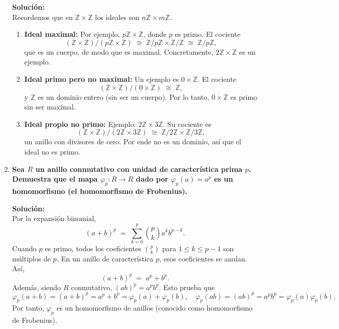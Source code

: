 \documentclass[12pt]{article}
\theoremstyle{definition}
\theoremstyle{remark}
\begin{document}
\begin{enumerate}[label=\textbf{\arabic*.}]
\textbf{Solución:}\\
Recordemos que en $\mathbb{Z} \times \mathbb{Z}$ los ideales son $n\mathbb{Z}\times m\mathbb{Z}$. 

\begin{enumerate}[label=(\alph*)]
\item \textbf{Ideal maximal:}  
   Por ejemplo, $p\mathbb{Z}\times \mathbb{Z}$, donde $p$ es primo. El cociente
   \[
   (\mathbb{Z}\times\mathbb{Z})/(p\mathbb{Z}\times \mathbb{Z})
   \;\cong\;
   \mathbb{Z}/p\mathbb{Z}
   \times
   \mathbb{Z}/\mathbb{Z}
   \;\cong\; \mathbb{Z}/p\mathbb{Z},
   \]
   que es un cuerpo, de modo que es maximal. Concretamente, $2\mathbb{Z}\times \mathbb{Z}$ es un ejemplo.

\item \textbf{Ideal primo pero no maximal:}  
   Un ejemplo es $0\times \mathbb{Z}$. El cociente
   \[
   (\mathbb{Z}\times \mathbb{Z})/(0\times \mathbb{Z})
   \;\cong\;
   \mathbb{Z},
   \]
   y $\mathbb{Z}$ es un dominio entero (sin ser un cuerpo). Por lo tanto, $0\times \mathbb{Z}$ es primo sin ser maximal.

\item \textbf{Ideal propio no primo:}  
   Ejemplo: $2\mathbb{Z}\times 3\mathbb{Z}$. Su cociente es
   \[
   (\mathbb{Z}\times \mathbb{Z})/(2\mathbb{Z}\times 3\mathbb{Z})
   \;\cong\;
   \mathbb{Z}/2\mathbb{Z}\times \mathbb{Z}/3\mathbb{Z},
   \]
   un anillo con divisores de cero. Por ende no es un dominio, así que el ideal no es primo.
\end{enumerate}


\item \textbf{Sea \( R \) un anillo conmutativo con unidad de característica prima \( p \). Demuestra que el mapa \( \varphi_p : R \rightarrow R \) dado por \( \varphi_p(a) = a^p \) es un homomorfismo (el homomorfismo de Frobenius).}

\textbf{Solución:}\\
Por la expansión binomial, 
\[
(a+b)^p \;=\; \sum_{k=0}^{p} \binom{p}{k} a^k b^{p-k}.
\]
Cuando $p$ es primo, todos los coeficientes $\binom{p}{k}$ para $1 \le k \le p-1$ son múltiplos de $p$. En un anillo de característica $p$, esos coeficientes se anulan. Así,
\[
(a+b)^p \;=\; a^p + b^p.
\]
Además, siendo $R$ conmutativo, $(ab)^p = a^p b^p$. Esto prueba que
\[
\varphi_p(a+b) = (a+b)^p = a^p + b^p = \varphi_p(a) + \varphi_p(b),
\quad
\varphi_p(ab) = (ab)^p = a^p b^p = \varphi_p(a)\varphi_p(b).
\]
Por tanto, $\varphi_p$ es un homomorfismo de anillos (conocido como homomorfismo de Frobenius).



\end{enumerate}
\end{document}
